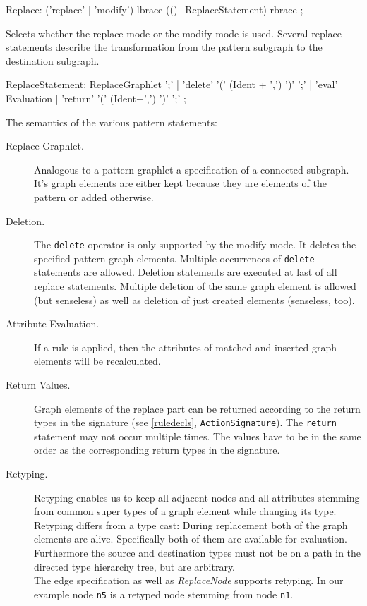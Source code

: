 \begin{rail}
  Replace: ('replace' | 'modify') lbrace (()+ReplaceStatement) rbrace ;
\end{rail}
Selects whether the replace mode or the modify mode is used. Several replace statements describe the transformation from the pattern subgraph to the destination subgraph.

\begin{rail}  
  ReplaceStatement: ReplaceGraphlet ';' |
    'delete' '(' (Ident + ',') ')' ';' |
    'eval' Evaluation |
    'return' '(' (Ident+',') ')' ';' ;
\end{rail}    
The semantics of the various pattern statements:
\begin{description}
  \item[Replace Graphlet.] Analogous to a pattern graphlet a specification of a connected subgraph. It's graph elements are either kept because they are elements of the pattern or added otherwise.
  \item[Deletion.] The \texttt{delete} operator is only supported by the modify mode. It deletes the specified pattern graph elements. Multiple occurrences of \texttt{delete} statements are allowed. Deletion statements are executed at last of all replace statements. Multiple deletion of the same graph element is allowed (but senseless) as well as deletion of just created elements (senseless, too).
  \item[Attribute Evaluation.] If a rule is applied, then the attributes of matched and inserted graph elements will be recalculated.
  \item[Return Values.] Graph elements of the replace part can be returned according to the return types in the signature (see \ref{ruledecls}, \texttt{ActionSignature}). The \texttt{return} statement may not occur multiple times. The values have to be in the same order as the corresponding return types in the signature.
  \item[Retyping.] Retyping enables us to keep all adjacent nodes and all attributes stemming from common super types of a graph element while changing its type. Retyping differs from a type cast: During replacement both of the graph elements are alive. Specifically both of them are available for evaluation. Furthermore the source and destination types must not be on a path in the directed type hierarchy tree, but are arbitrary.\\
The edge specification as well as \emph{ReplaceNode} supports retyping. In our example node \texttt{n5} is a retyped node stemming from node \texttt{n1}.
\end{description}    
    
